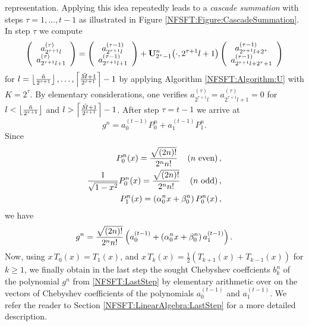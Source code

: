 representation. Applying this idea repeatedly leads to a \emph{cascade 
summation} with steps $\tau=1,\ldots,t-1$ as illustrated in Figure \ref{NFSFT:Figure:CascadeSummation}. 
In step $\tau$ we compute
\begin{equation}
  \label{NFSFT:GeneralStep}
  \left(\begin{array}{c}
    a_{2^{\tau+1}l}^{(\tau)}\\
    a_{2^{\tau+1}l+1}^{(\tau)} 
  \end{array}\right)
  =
  \left(\begin{array}{c}
    a_{2^{\tau+1}l}^{(\tau-1)}\\
    a_{2^{\tau+1}l+1}^{(\tau-1)} 
  \end{array}\right)
  + {\mathbf{U}_{2^{\tau}-1}^{n}{\hspace{-0.4ex}}\left(\cdot,2^{\tau+1}l+1\right)}
  \left(\begin{array}{c}
    a_{2^{\tau+1}l+2^{\tau}}^{(\tau-1)}\\
    a_{2^{\tau+1}l+2^{\tau}+1}^{(\tau-1)} 
  \end{array}\right)
\end{equation}
for $l=\left\lfloor\frac{\tilde{n}}{2^{\tau+1}}\right\rfloor,\ldots,\left\lceil\frac{\tilde{M}+1}{2^{\tau+1}}\right\rceil-1$
by applying Algorithm \ref{NFSFT:Algorithm:U} with $K=2^{\tau}$. By elementary considerations, one verifies
$a_{2^{\tau+1}l}^{(\tau)} = a_{2^{\tau+1}l+1}^{(\tau)} = 0$ for $l < \left\lfloor\frac{\tilde{n}}{2^{\tau+1}}\right\rfloor$ and 
$l > \left\lceil\frac{\tilde{M}+1}{2^{\tau+1}}\right\rceil-1$.
After step $\tau = t-1$ we arrive at
\begin{equation}
  \nonumber
  g^n = a_{0}^{(t-1)} P_{0}^{n} + a_{1}^{(t-1)} P_{1}^{n}.
\end{equation}
Since 
\begin{align}
  \nonumber
  P_{0}^n{\hspace{-0.4ex}}\left(x\right) = \frac{\sqrt{(2n)!}}{2^n n!} \quad \left(\text{$n$ even}\right),\\
  \nonumber
  \frac{1}{\sqrt{1-x^2}}P_{0}^n{\hspace{-0.4ex}}\left(x\right) = \frac{\sqrt{(2n)!}}{2^n n!} \quad \left(\text{$n$ odd}\right),\\
  P_{1}^n{\hspace{-0.4ex}}\left(x\right) = \left(\alpha_{0}^nx + \beta_{0}^n\right)P_{0}^n{\hspace{-0.4ex}}\left(x\right),
\end{align} 
we have
\begin{equation}
  \label{NFSFT:LastStep}
  g^n = \frac{\sqrt{(2n)!}}{2^n n!} \left(a_{0}^{(t-1)} + 
  \left(\alpha_{0}^nx + \beta_{0}^n\right) a_{1}^{(t-1)}\right).
\end{equation}
Now, using 
$x\,T_{0}(x) = T_{1}(x)$, and $x\,T_{k}(x) = \frac{1}{2}\left( T_{k+1}(x) + T_{k-1}(x) \right)$ for $k \ge 1$,
we finally obtain in the last step the sought Chebyshev coeffcients $b_{k}^n$ of the polynomial $g^n$ 
from \eqref{NFSFT:LastStep} by
elementary arithmetic over on the vectors of Chebyshev coefficients of the polynomials $a_{0}^{(t-1)}$ and $a_{1}^{(t-1)}$. We refer the reader to Section \ref{NFSFT:LinearAlgebra:LastStep} for a more detailed description.

